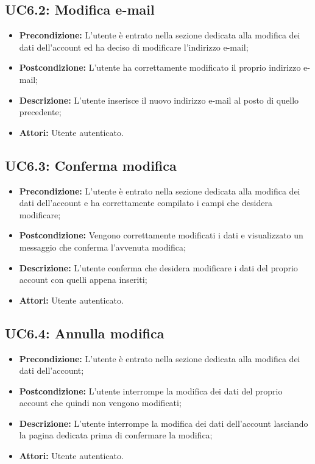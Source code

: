 \subsection{ UC6.2: Modifica e-mail}

\begin{itemize}
	\item \textbf{Precondizione:} L’utente è entrato nella sezione dedicata alla modifica dei dati dell’account ed ha deciso di modificare l’indirizzo e-mail;
	\item \textbf{Postcondizione:} L’utente ha correttamente modificato il proprio indirizzo e-mail;
	\item \textbf{Descrizione:} L’utente inserisce il nuovo indirizzo e-mail al posto di quello precedente;
	\item \textbf{Attori:} Utente autenticato.
\end{itemize}
\subsection{ UC6.3: Conferma modifica}

\begin{itemize}
	\item \textbf{Precondizione:} L’utente è entrato nella sezione dedicata alla modifica dei dati dell’account e ha correttamente compilato i campi che desidera modificare;
	\item \textbf{Postcondizione:} Vengono correttamente modificati i dati e visualizzato un messaggio che conferma l’avvenuta modifica;
	\item \textbf{Descrizione:} L’utente conferma che desidera modificare i dati del proprio account con quelli appena inseriti;
	\item \textbf{Attori:} Utente autenticato.
\end{itemize}
\subsection{ UC6.4: Annulla modifica}

\begin{itemize}
	\item \textbf{Precondizione:} L’utente è entrato nella sezione dedicata alla modifica dei dati dell’account;
	\item \textbf{Postcondizione:} L’utente interrompe la modifica dei dati del proprio account che quindi non vengono modificati;
	\item \textbf{Descrizione:} L’utente interrompe la modifica dei dati dell’account lasciando la pagina dedicata prima di confermare la modifica;
	\item \textbf{Attori:} Utente autenticato.
\end{itemize}
